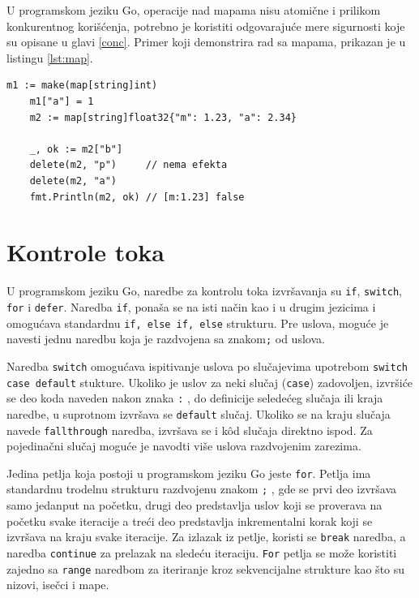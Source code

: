 \documentclass[12pt,oneside]{memoir}
\begin{document}
U programskom jeziku Go, operacije nad mapama nisu atomične i prilikom konkurentnog korišćenja, potrebno je koristiti odgovarajuće mere sigurnosti koje su opisane u glavi \ref{conc}. Primer koji demonstrira rad sa mapama, prikazan je u listingu \ref{lst:map}.

\begin{center}
\begin{lstlisting}[caption=Primer koji demonstrira rad sa mapama, label={lst:map},  backgroundcolor=\color{background}]
	m1 := make(map[string]int)
	m1["a"] = 1
	m2 := map[string]float32{"m": 1.23, "a": 2.34}
	
	_, ok := m2["b"]
	delete(m2, "p")		// nema efekta
	delete(m2, "a")
	fmt.Println(m2, ok) // [m:1.23] false
\end{lstlisting}
\end{center}

\section{Kontrole toka}

U programskom jeziku Go, naredbe za kontrolu toka izvršavanja su \texttt{if}, \texttt{switch}, \texttt{for} i \texttt{defer}. Naredba \texttt{if}, ponaša se na isti način kao i u drugim jezicima i omogućava standardnu \texttt{if, else if, else} strukturu. Pre uslova, moguće je navesti jednu naredbu koja je razdvojena sa znakom\texttt{;} od uslova. 

Naredba \texttt{switch} omogućava ispitivanje uslova po slučajevima upotrebom \texttt{switch case default} stukture. Ukoliko je uslov za neki slučaj (\texttt{case}) zadovoljen, izvršiće se deo koda naveden nakon znaka \texttt{:} , do definicije seledećeg slučaja ili kraja naredbe, u suprotnom izvršava se \texttt{default} slučaj. Ukoliko se na kraju slučaja navede \texttt{fallthrough} naredba, izvršava se i k\^{o}d slučaja direktno ispod. Za pojedinačni slučaj moguće je navodti više uslova razdvojenim zarezima. 

Jedina petlja koja postoji u programskom jeziku Go jeste \texttt{for}. Petlja ima standardnu trodelnu strukturu razdvojenu znakom \texttt{;} , gde se prvi deo  izvršava samo jedanput na početku, drugi deo predstavlja uslov koji se proverava na početku svake iteracije a treći deo predstavlja inkrementalni korak koji se izvršava na kraju svake iteracije. Za izlazak iz petlje, koristi se \texttt{break} naredba, a naredba \texttt{continue} za prelazak na sledeću iteraciju. \texttt{For} petlja se može koristiti zajedno sa \texttt{range} naredbom za iteriranje kroz sekvencijalne strukture kao što su nizovi, isečci i mape. 
\end{document}
